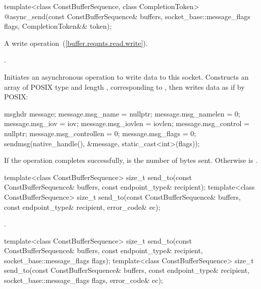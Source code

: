 \begin{itemdecl}
template<class ConstBufferSequence, class CompletionToken>
  @\DEDUCED@ async_send(const ConstBufferSequence& buffers,
                     socket_base::message_flags flags,
                     CompletionToken&& token);
\end{itemdecl}

\begin{itemdescr}
\pnum
A write operation~(\ref{buffer.reqmts.read.write}).

\pnum
\completionsig {}.

\pnum
\effects Initiates an asynchronous operation to write data to this socket. Constructs an array  of POSIX type  and length , corresponding to , then writes data as if by POSIX:
\begin{codeblock}
msghdr message;
message.msg_name = nullptr;
message.msg_namelen = 0;
message.msg_iov = iov;
message.msg_iovlen = iovlen;
message.msg_control = nullptr;
message.msg_controllen = 0;
message.msg_flags = 0;
sendmsg(native_handle(), &message, static_cast<int>(flags));
\end{codeblock}


\pnum
If the operation completes successfully,  is the number of bytes sent. Otherwise  is .
\end{itemdescr}

\begin{itemdecl}
template<class ConstBufferSequence>
  size_t send_to(const ConstBufferSequence& buffers,
                 const endpoint_type& recipient);
template<class ConstBufferSequence>
  size_t send_to(const ConstBufferSequence& buffers,
                 const endpoint_type& recipient, error_code& ec);
\end{itemdecl}

\begin{itemdescr}
\pnum
\returns {}.
\end{itemdescr}

\begin{itemdecl}
template<class ConstBufferSequence>
  size_t send_to(const ConstBufferSequence& buffers,
                 const endpoint_type& recipient,
                 socket_base::message_flags flags);
template<class ConstBufferSequence>
  size_t send_to(const ConstBufferSequence& buffers,
                 const endpoint_type& recipient,
                 socket_base::message_flags flags, error_code& ec);
\end{itemdecl}

